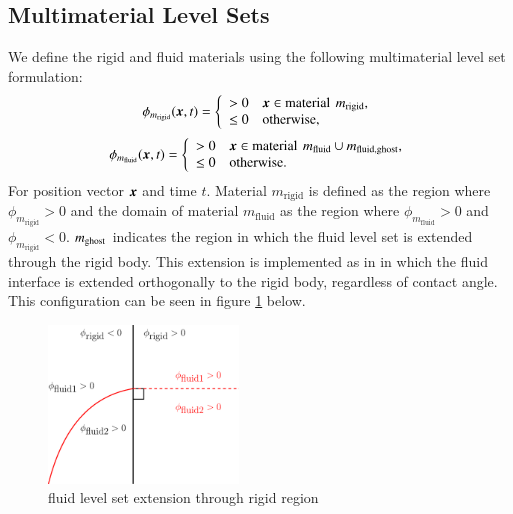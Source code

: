 \documentclass[preprint,12pt]{Definitions/elsarticle}
\newcommand{\tn}{\textnormal}
\newcommand{\bmx}{\mbox{\boldmath $x$\unboldmath}}
\begin{document}
\subsection{Multimaterial Level Sets}
\noindent We define the rigid and fluid materials using the following multimaterial level set formulation:
\begin{equation}
\phi_{m_\textrm{rigid}}(\bmx,t) = \left\{
\begin{array}{ll}
> 0 & \bmx \in \tn{material}\,\: m_\textrm{rigid}, \\ 
\leq 0 & \tn{otherwise},
\end{array}
\right.
\end{equation}
\begin{equation}
\phi_{m_\textrm{fluid}}(\bmx,t) = \left\{
\begin{array}{ll}
> 0 & \bmx \in \tn{material}\,\: m_\textrm{fluid}\cup m_\textrm{fluid,ghost}, \\ 
\leq 0 & \tn{otherwise}.
\end{array}
\right.
\end{equation}
For position vector $\bmx$ and time $t$. Material $m_\textrm{rigid}$ is defined as the region where $\phi_{m_\textrm{rigid}}>0$ and the domain of material $m_\textrm{fluid}$ as the region where $\phi_{m_\textrm{fluid}}>0$ and $\phi_{m_\textrm{rigid}}<0$. $m_\tn{ghost}$ indicates the region in which the fluid level set is extended through the rigid body. This extension is implemented as in \cite{ArientiSussman2014embedded} in which the fluid interface is extended orthogonally to the rigid body, regardless of contact angle. This configuration can be seen in figure \ref{fig:LSextend} below.\\

\begin{figure}[htbp]
	\centering
	\includegraphics[width=0.45\textwidth]{LSextend.eps}
	\caption{fluid level set extension through rigid region}
	\label{fig:LSextend}
\end{figure}
\end{document}
